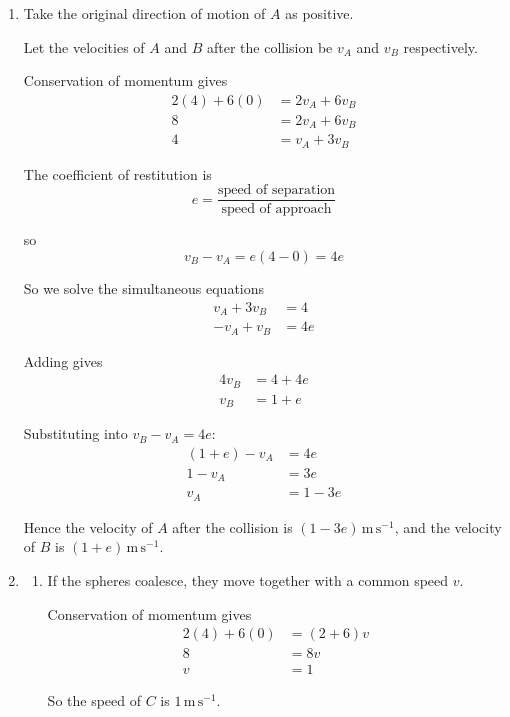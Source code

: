 \documentclass[leqno]{article}
\begin{document}
\begin{enumerate}[
  label=\textbf{\arabic*.},
  leftmargin=*,
  topsep=0pt,
  partopsep=0pt,
  parsep=0pt
]
\vspace*{10pt}

\begin{djsSolution}
\begin{enumerate}[label=\textbf{(\alph*)}]
  \item Take the original direction of motion of $A$ as positive.

Let the velocities of $A$ and $B$ after the collision be $v_A$ and $v_B$ respectively.

Conservation of momentum gives
\begin{align*}
2(4)+6(0)&=2v_A+6v_B \\
8&=2v_A+6v_B \\
4&=v_A+3v_B
\end{align*}

The coefficient of restitution is
\[
e=\frac{\text{speed of separation}}{\text{speed of approach}}
\]

so
\[
v_B-v_A=e(4-0)=4e
\]

So we solve the simultaneous equations
\begin{align*}
v_A+3v_B&=4 \\
-v_A+v_B&=4e
\end{align*}

Adding gives
\begin{align*}
4v_B&=4+4e \\
v_B&=1+e
\end{align*}

Substituting into $v_B-v_A=4e$:
\begin{align*}
(1+e)-v_A&=4e \\
1-v_A&=3e \\
v_A&=1-3e
\end{align*}

Hence the velocity of $A$ after the collision is $(1-3e)\,\mathrm{m}\,\mathrm{s}^{-1}$, and the velocity of $B$ is $(1+e)\,\mathrm{m}\,\mathrm{s}^{-1}$.

  \item \begin{enumerate}[label=(\roman*)]
    \item If the spheres coalesce, they move together with a common speed $v$.

Conservation of momentum gives
\begin{align*}
2(4)+6(0)&=(2+6)v \\
8&=8v \\
v&=1
\end{align*}

So the speed of $C$ is $1\,\mathrm{m}\,\mathrm{s}^{-1}$.


\end{enumerate}
\end{enumerate}
\end{djsSolution}
\end{enumerate}
\end{document}
